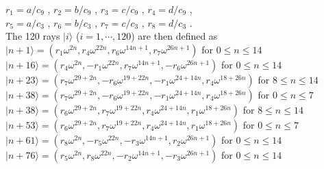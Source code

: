 \hspace{2mm} $r_{1}=a/c_{9}$ , \hspace{2mm} $r_{2}=b/c_{9}$ ,  \hspace{2mm} $r_{3}=c/c_{9}$ ,  \hspace{2mm} $r_{4}=d/c_{9}$ , \\
\indent
\hspace{2mm} $r_{5}=a/c_{3}$ , \hspace{2mm} $r_{6}=b/c_{3}$ ,  \hspace{2mm} $r_{7}=c/c_{3}$ ,  \hspace{2mm} $r_{8}=d/c_{3}$ . \\

\noindent
The 120 rays $|i\rangle$ ($i=1,\cdots, 120$) are then defined as\\

\noindent
$|n+1\rangle = (r_{1}\omega^{2n},r_{4}\omega^{22n},r_{6}\omega^{14n+1},r_{7}\omega^{26n+1})$ \hspace{23 mm} for $0\leq n \leq 14$\\
$|n+16\rangle = (r_{4}\omega^{2n},-r_{1}\omega^{22n},r_{7}\omega^{14n+1},-r_{6}\omega^{26n+1})$ \hspace{16 mm} for $0\leq n \leq 14$\\
$|n+23\rangle = (r_{7}\omega^{29+2n},-r_{6}\omega^{19+22n},-r_{1}\omega^{24+14n},r_{4}\omega^{18+26n})$ \hspace{3 mm} for $8\leq n \leq 14$\\
$|n+38\rangle = (r_{7}\omega^{29+2n},-r_{6}\omega^{19+22n},-r_{1}\omega^{24+14n},r_{4}\omega^{18+26n})$ \hspace{3 mm} for $0\leq n \leq 7$\\
$|n+38\rangle = (r_{6}\omega^{29+2n},r_{7}\omega^{19+22n},r_{4}\omega^{24+14n},r_{1}\omega^{18+26n})$ \hspace{9 mm} for $8\leq n \leq 14$\\
$|n+53\rangle = (r_{6}\omega^{29+2n},r_{7}\omega^{19+22n},r_{4}\omega^{24+14n},r_{1}\omega^{18+26n})$ \hspace{9 mm} for $0\leq n \leq 7$\\
$|n+61\rangle = (r_{8}\omega^{2n},-r_{5}\omega^{22n},-r_{3}\omega^{14n+1},r_{2}\omega^{26n+1})$ \hspace{16 mm} for $0\leq n \leq 14$\\
$|n+76\rangle = (r_{5}\omega^{2n},r_{8}\omega^{22n},-r_{2}\omega^{14n+1},-r_{3}\omega^{26n+1})$ \hspace{16 mm} for $0\leq n \leq 14$\\
